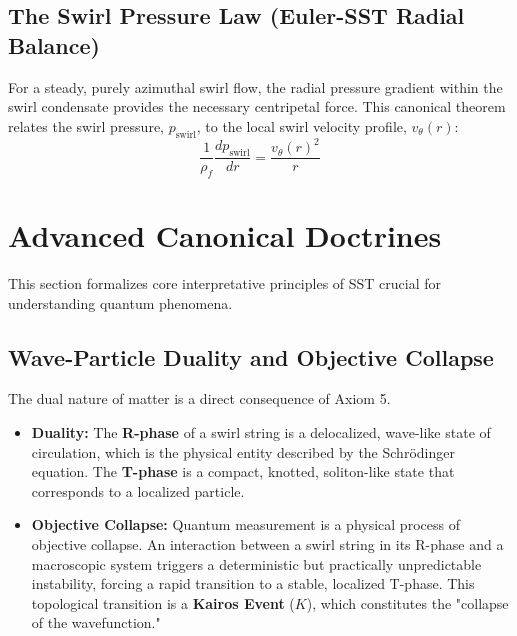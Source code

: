 \documentclass[11pt]{article}
\newcommand{\rhof}{\rho_{\!f}}
\begin{document}
\subsection{The Swirl Pressure Law (Euler-SST Radial Balance)}
    For a steady, purely azimuthal swirl flow, the radial pressure gradient within the swirl condensate provides the necessary centripetal force. This canonical theorem relates the swirl pressure, $p_{\text{swirl}}$, to the local swirl velocity profile, $v_{\theta}(r)$:
    \begin{equation}
    \boxed{
        \frac{1}{\rhof}\frac{dp_{\text{swirl}}}{dr} = \frac{v_{\theta}(r)^2}{r}
    }
    \end{equation}

\section{Advanced Canonical Doctrines}
This section formalizes core interpretative principles of SST crucial for understanding quantum phenomena.

\subsection{Wave-Particle Duality and Objective Collapse}
    The dual nature of matter is a direct consequence of Axiom 5.
    \begin{itemize}
    \item \textbf{Duality:} The \textbf{R-phase} of a swirl string is a delocalized, wave-like state of circulation, which is the physical entity described by the Schrödinger equation. The \textbf{T-phase} is a compact, knotted, soliton-like state that corresponds to a localized particle.
    \item \textbf{Objective Collapse:} Quantum measurement is a physical process of objective collapse. An interaction between a swirl string in its R-phase and a macroscopic system triggers a deterministic but practically unpredictable instability, forcing a rapid transition to a stable, localized T-phase. This topological transition is a \textbf{Kairos Event} ($K$), which constitutes the "collapse of the wavefunction."
    \end{itemize}
\end{document}

